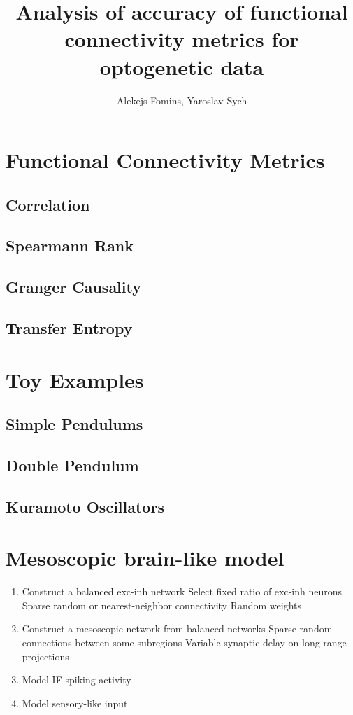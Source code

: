 \documentclass[10pt,a4paper,draft]{article}
\title{Analysis of accuracy of functional connectivity metrics for optogenetic data}
\author{Alekejs Fomins, Yaroslav Sych}
\begin{document}
\maketitle

\section{Functional Connectivity Metrics}
\subsection{Correlation}
\subsection{Spearmann Rank}
\subsection{Granger Causality}
\subsection{Transfer Entropy}

\section{Toy Examples}
\subsection{Simple Pendulums}
\subsection{Double Pendulum}
\subsection{Kuramoto Oscillators}

\section{Mesoscopic brain-like model}

\begin{enumerate}
  \item Construct a balanced exc-inh network
    \subitem Select fixed ratio of exc-inh neurons
    \subitem Sparse random or nearest-neighbor connectivity
    \subitem Random weights
  \item Construct a mesoscopic network from balanced networks
    \subitem Sparse random connections between some subregions
    \subitem Variable synaptic delay on long-range projections
  \item Model IF spiking activity
  \item Model sensory-like input
\end{enumerate}
\end{document}
